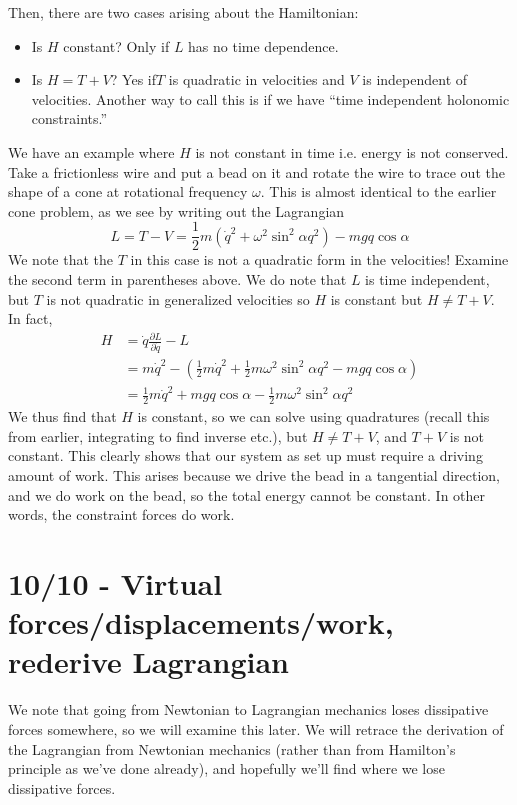 \documentclass[10pt]{report}
\newcommand{\pd}[2]{\frac{\partial #1}{\partial#2}}
\begin{document}
Then, there are two cases arising about the Hamiltonian:
\begin{itemize}
    \item Is $H$ constant? Only if $L$ has no time dependence.
    \item Is $H=T+V$? Yes if$T$ is quadratic in velocities and $V$ is independent of velocities. Another way to call this is if we have ``time independent holonomic constraints.''
\end{itemize}
We have an example where $H$ is not constant in time i.e. energy is not conserved. Take a frictionless wire and put a bead on it and rotate the wire to trace out the shape of a cone at rotational frequency $\omega$. This is almost identical to the earlier cone problem, as we see by writing out the Lagrangian
$$L=T-V=\frac{1}{2}m\left( \dot{q}^2 + \omega^2\sin^2\alpha q^2 \right) - mgq\cos\alpha$$
We note that the $T$ in this case is not a quadratic form in the velocities! Examine the second term in parentheses above. We do note that $L$ is time independent, but $T$ is not quadratic in generalized velocities so $H$ is constant but $H\neq T+V$. In fact,
\begin{align*}
    H&= \dot{q}\pd{L}{\dot{q}} - L\\
    &= m\dot{q}^2-\left( \frac{1}{2}m\dot{q}^2 + \frac{1}{2}m\omega^2\sin^2\alpha q^2 - mgq\cos\alpha \right)\\
    &= \frac{1}{2}m\dot{q}^2 + mgq\cos\alpha - \frac{1}{2}m\omega^2\sin^2\alpha q^2
\end{align*}
We thus find that $H$ is constant, so we can solve using quadratures (recall this from earlier, integrating to find inverse etc.), but $H \neq T+V$, and $T+V$ is not constant. This clearly shows that our system as set up must require a driving amount of work. This arises because we drive the bead in a tangential direction, and we do work on the bead, so the total energy cannot be constant. In other words, the constraint forces do work.

\chapter{10/10 - Virtual forces/displacements/work, rederive Lagrangian}

We note that going from Newtonian to Lagrangian mechanics loses dissipative forces somewhere, so we will examine this later. We will retrace the derivation of the Lagrangian from Newtonian mechanics (rather than from Hamilton's principle as we've done already), and hopefully we'll find where we lose dissipative forces. 
\end{document}
